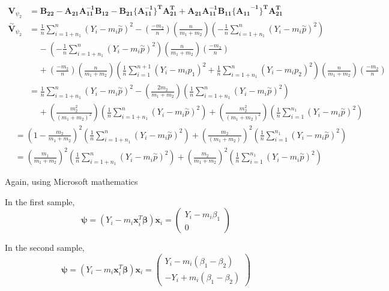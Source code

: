 \documentclass[
  letterpaper,
  DIV=11,
  numbers=noendperiod]{scrreprt}
\begin{document}
\[\begin{aligned}
\mathbf V_{\psi_2} &= \mathbf{B_{22} - A_{21}A_{11}^{-1}B_{12}- B_{21}\{A_{11}^{-1}\}^TA_{21}^T+A_{21}A_{11}^{-1}B_{11}{\{A_{11}}^{-1}\}^TA_{21}^T} \\
\overset \sim {\mathbf V}_{\psi_2} &= \frac 1 n \sum_{i=1+n_1}^{n} (Y_i - m_i \overset \sim p )^2 - \left(\frac {-m_2}{n} \right)\left(\frac {n}{m_1+m_2} \right)\left(-\frac 1 n \sum_{i=1+n_1}^{n} (Y_i - m_i \overset \sim p )^2 \right) \\
&~~~~~ - \left(-\frac 1 n \sum_{i=1+n_1}^{n} (Y_i - m_i \overset \sim p )^2 \right)\left(\frac {n}{m_1+m_2} \right)\left(\frac {-m_2}{n} \right) \\
&~~~~~ + \left( \frac {-m_2}{n} \right)\left( \frac {n}{m_1+m_2}\right)\left( \frac 1 n\sum_{i=1}^{n+1} (Y_i - m_i p_1)^2+ \frac 1 n \sum_{i=1+n_1}^{n} (Y_i - m_i p_2)^2\right) \left(\frac {n}{m_1+m_2} \right) \left(\frac{-m_2}{n} \right) \\
&= \frac 1 n \sum_{i=1+n_1}^{n} (Y_i - m_i \overset \sim p )^2 - \left(\frac {2m_2}{m_1+m_2} \right)\left(\frac 1 n \sum_{i=1+n_1}^{n} (Y_i - m_i \overset \sim p )^2 \right) \\
&~~~~~ + \left( \frac {m_2^2}{(m_1+m_2)^2}\right)\left( \frac 1 n \sum_{i=1+n_1}^{n} (Y_i - m_i \overset \sim p )^2\right)+ \left( \frac {m_2^2}{(m_1+m_2)^2}\right)\left( \frac 1 n \sum_{i=1}^{n_1} (Y_i - m_i \overset \sim p )^2\right)
\end{aligned}\] \[\begin{aligned}
&=\left( 1-\frac {m_2}{m_1+m_2}\right)^2\left( \frac 1 n \sum_{i=1+n_1}^{n} (Y_i - m_i \overset \sim p )^2\right)+ \left( \frac {m_2}{(m_1+m_2)}\right)^2\left( \frac 1 n \sum_{i=1}^{n_1} (Y_i - m_i \overset \sim p )^2\right)\\
&=\left( \frac {m_1}{m_1+m_2}\right)^2\left( \frac 1 n \sum_{i=1+n_1}^{n} (Y_i - m_i \overset \sim p )^2\right)+ \left( \frac {m_2}{m_1+m_2}\right)^2\left( \frac 1 n \sum_{i=1}^{n_1} (Y_i - m_i \overset \sim p )^2\right)
\end{aligned}\]

Again, using Microsoft mathematics

In the first sample,
\[\boldsymbol \psi =(Y_i - m_i \mathbf x_i^T \boldsymbol \beta) \mathbf x_i = \begin{pmatrix} Y_i -m_i \beta_1 \\0 \end{pmatrix}\]

In the second sample,
\[\boldsymbol \psi =(Y_i - m_i \mathbf x_i^T \boldsymbol \beta) \mathbf x_i = \begin{pmatrix} Y_i -m_i (\beta_1- \beta_2) \\ -Y_i +m_i (\beta_1- \beta_2)\end{pmatrix}\]
\end{document}
